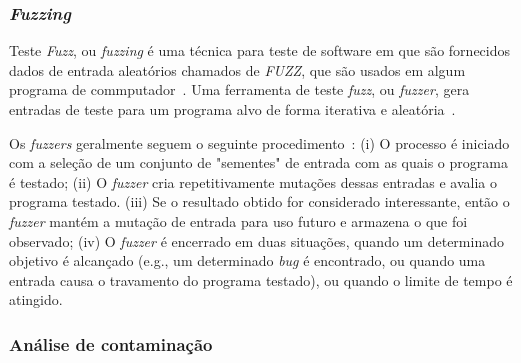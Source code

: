 \subsubsection*{\textbf{\textit{Fuzzing}}}
Teste \textit{Fuzz}, ou \textit{fuzzing} é uma técnica para teste de software em que são fornecidos dados de entrada aleatórios chamados de \textit{FUZZ}, que são usados em algum programa de commputador~\cite{almakhour2020verification-survey}. Uma ferramenta de teste \textit{fuzz}, ou \textit{fuzzer}, gera entradas de teste para um programa alvo de forma iterativa e aleatória~\cite{klees2018fuzz-evaluating}.

Os \textit{fuzzers} geralmente seguem o seguinte procedimento~\cite{klees2018fuzz-evaluating}: (i) O processo é iniciado com a seleção de um conjunto de "sementes" de entrada com as quais o programa é testado; (ii) O \textit{fuzzer} cria repetitivamente mutações dessas entradas e avalia o programa testado. (iii) Se o resultado obtido for considerado interessante, então o \textit{fuzzer} mantém a mutação de entrada para uso futuro e armazena o que foi observado; (iv) O \textit{fuzzer} é encerrado em duas situações, quando um determinado objetivo é alcançado (e.g., um determinado \textit{bug} é encontrado, ou quando uma entrada causa o travamento do programa testado), ou quando o limite de tempo é atingido.

\subsubsection*{\textbf{Análise de contaminação}}

